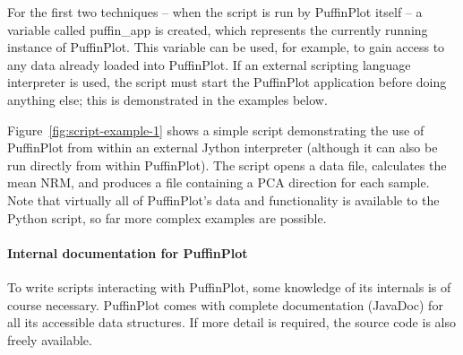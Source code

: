 \documentclass[a4paper,british]{article}
\newcommand{\ppcmd}[1]{\textsf{#1}} %
\newcommand{\caps}[1]{\MakeTextUppercase{#1}} %
\begin{document}
For the first two techniques -- when the script is run by PuffinPlot itself
-- a variable called \ppcmd{puffin\_app} is created, which represents the
currently running instance of PuffinPlot. This variable can be used, for
example, to gain access to any data already loaded into PuffinPlot. If an
external scripting language interpreter is used, the script must start the
PuffinPlot application before doing anything else; this is demonstrated in
the examples below.

Figure~\ref{fig:script-example-1} shows a simple script demonstrating the use
of PuffinPlot from within an external Jython interpreter (although it can
also be run directly from within PuffinPlot). The script opens a data file,
calculates the mean \caps{nrm}, and produces a file containing a \caps{pca}
direction for each sample. Note that virtually all of PuffinPlot's data and
functionality is available to the Python script, so far more complex examples
are possible.

\paragraph{Internal documentation for PuffinPlot} To write scripts
interacting with PuffinPlot, some knowledge of its internals is of course
necessary. PuffinPlot comes with complete documentation (JavaDoc) for all its
accessible data structures. If more detail is required, the source code is
also freely available.
\end{document}
